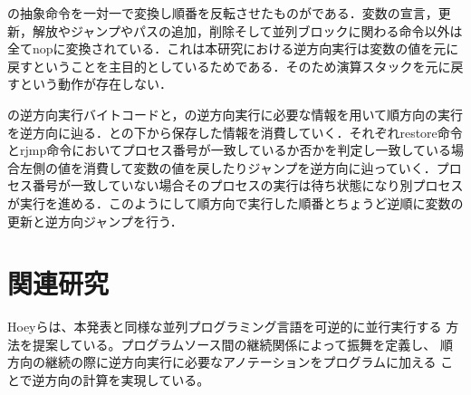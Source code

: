 \documentclass[submit,PRO]{ipsj}
\begin{document}
の抽象命令を一対一で変換し順番を反転させたものがである．変数の宣言，更新，解放やジャンプやパスの追加，削除そして並列ブロックに関わる命令以外は全てnopに変換されている．これは本研究における逆方向実行は変数の値を元に戻すということを主目的としているためである．そのため演算スタックを元に戻すという動作が存在しない．

の逆方向実行バイトコードと，の逆方向実行に必要な情報を用いて順方向の実行を逆方向に辿る．との下から保存した情報を消費していく．それぞれrestore命令とrjmp命令においてプロセス番号が一致しているか否かを判定し一致している場合左側の値を消費して変数の値を戻したりジャンプを逆方向に辿っていく．プロセス番号が一致していない場合そのプロセスの実行は待ち状態になり別プロセスが実行を進める．このようにして順方向で実行した順番とちょうど逆順に変数の更新と逆方向ジャンプを行う．


\section{関連研究}

Hoeyらは、本発表と同様な並列プログラミング言語を可逆的に並行実行する
方法を提案している。プログラムソース間の継続関係によって振舞を定義し、
順方向の継続の際に逆方向実行に必要なアノテーションをプログラムに加える
ことで逆方向の計算を実現している。


%
\end{document}
